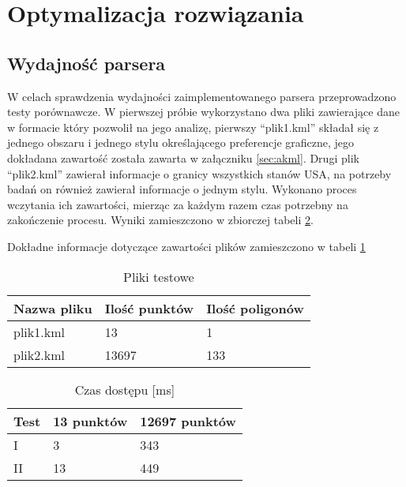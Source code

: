 ﻿\clearpage
\newpage
\section{Optymalizacja rozwiązania}
\label{sec:optymalizacja}


\subsection{Wydajność parsera}
\label{subsec:wydajnosc}

W celach sprawdzenia wydajności zaimplementowanego parsera przeprowadzono testy porównawcze. W pierwszej próbie wykorzystano dwa pliki zawierające dane w formacie który pozwolił na jego analizę, pierwszy ``plik1.kml''  składał się z jednego obszaru i jednego stylu określającego preferencje graficzne, jego dokładana zawartość została zawarta w załączniku \ref{sec:akml}. Drugi plik ``plik2.kml'' zawierał informacje o granicy wszystkich stanów USA, na potrzeby badań on również zawierał informacje o jednym stylu.
Wykonano proces wczytania ich zawartości, mierząc za każdym razem czas potrzebny na zakończenie procesu. Wyniki zamieszczono w zbiorczej tabeli \ref{tab:speedTest}.

Dokładne informacje dotyczące zawartości plików zamieszczono w tabeli \ref{tab:testFile}

\begin{table}[H]
    \centering
    \begin{tabular}{|l|l|l|}
    \hline
    Nazwa pliku & Ilość punktów & Ilość poligonów \\ \hline
    plik1.kml & 13 & 1 \\ \hline
    plik2.kml & 13697 & 133 \\ \hline

    \end{tabular}
    \caption{Pliki testowe}
    \label{tab:testFile}
\end{table}


\begin{table} [H]
    \centering
    \begin{tabular}{|l|l|l|}
    \hline
    Test & 13 punktów & 12697 punktów \\\hline
    I & 3 & 343 \\\hline
    II & 13 & 449 \\\hline

    \end{tabular}
    \caption{Czas dostępu [ms]}
    \label{tab:speedTest}
\end{table}

